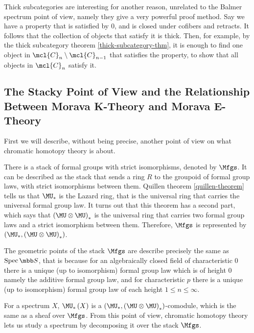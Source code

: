 \begin{remark}
	Thick subcategories are interesting for another reason, unrelated to the Balmer spectrum point of view, namely they give a very powerful proof method.
	Say we have a property that is satisfied by $0$, and is closed under cofibers and retracts.
	It follows that the collection of objects that satisfy it is thick.
	Then, for example, by the thick subcategory theorem \ref{thick-subcategory-thm}, it is enough to find one object in $\mcl{C}_n \setminus \mcl{C}_{n-1}$ that satisfies the property, to show that all objects in $\mcl{C}_n$ satisfy it.
\end{remark}



\subsection{The Stacky Point of View and the Relationship Between Morava K-Theory and Morava E-Theory}

First we will describe, without being precise, another point of view on what chromatic homotopy theory is about.

There is a stack of formal groups with strict isomorphisms, denoted by $\Mfgs$.
It can be described as the stack that sends a ring $R$ to the groupoid of formal group laws, with strict isomorphisms between them.
Quillen theorem \ref{quillen-theorem} tells us that $\MU_*$ is the Lazard ring, that is the universal ring that carries the universal formal group law.
It turns out that this theorem has a second part, which says that $\left(\MU \otimes \MU\right)_*$ is the universal ring that carries two formal group laws and a strict isomorphism between them.
Therefore, $\Mfgs$ is represented by $\left(\MU_*, \left(\MU \otimes \MU\right)_*\right)$.

The geometric points of the stack $\Mfgs$ are describe precisely the same as $\spec \SS$, that is because for an algebraically closed field of characteristic $0$ there is a unique (up to isomorphism) formal group law which is of height $0$ namely the additive formal group law, and for characteristic $p$ there is a unique (up to isomorphism) formal group law of each height $1 \leq n \leq \infty$.

For a spectrum $X$, $\MU_*\left(X\right)$ is a $\left(\MU_*, \left(\MU \otimes \MU\right)_*\right)$-comodule, which is the same as a sheaf over $\Mfgs$.
From this point of view, chromatic homotopy theory lets us study a spectrum by decomposing it over the stack $\Mfgs$.

